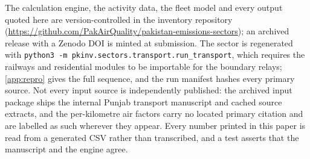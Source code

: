 \documentclass[5p,times,authoryear]{elsarticle}
\begin{document}
The calculation engine, the activity data, the fleet model and every output quoted here
are version-controlled in the inventory repository
(\url{https://github.com/PakAirQuality/pakistan-emissions-sectors}); an archived release
with a Zenodo DOI is minted at submission. The sector is regenerated with
\texttt{python3 -m pkinv.sectors.transport.run\_transport}, which requires the railways
and residential modules to be importable for the boundary relays; \ref{app:repro} gives
the full sequence, and the run manifest hashes every primary source. Not every input
source is independently published: the archived input package ships the internal Punjab
transport manuscript and cached source extracts, and the per-kilometre air factors carry
no located primary citation and are labelled as such wherever they appear. Every number
printed in this paper is read from a generated CSV rather than transcribed, and a test
asserts that the manuscript and the engine agree.




\appendix
\renewcommand{\thetable}{\arabic{table}}%
\renewcommand{\thefigure}{\arabic{figure}}%

\FloatBarrier

\FloatBarrier
\end{document}
